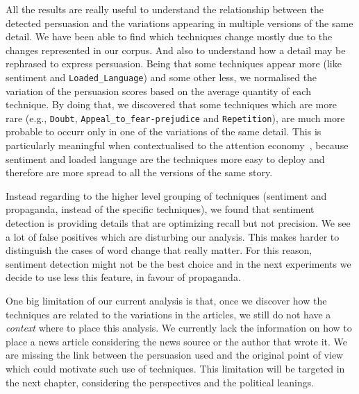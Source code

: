 All the results are really useful to understand the relationship between the detected persuasion and the variations appearing in multiple versions of the same detail.
We have been able to find which techniques change mostly due to the changes represented in our corpus. And also to understand how a detail may be rephrased to express persuasion.
Being that some techniques appear more (like 
 sentiment and \texttt{Loaded\_Language}) and some other less, we normalised the variation of the persuasion scores based on the average quantity of each technique.
 By doing that, we discovered that some techniques which are more rare (e.g., \texttt{Doubt}, \texttt{Appeal\_to\_fear-prejudice} and \texttt{Repetition}), are much more probable to occurr only in one of the variations of the same detail.
This is particularly meaningful when contextualised to the attention economy~\citep{davenport2001attention}, because sentiment and loaded language are the techniques more easy to deploy and therefore are more spread to all the versions of the same story.

Instead regarding to the higher level grouping of techniques (sentiment and propaganda, instead of the specific techniques), we found that sentiment detection is providing details that are optimizing recall but not precision. We see a lot of false positives which are disturbing our analysis. This makes harder to distinguish the cases of word change that really matter. For this reason, sentiment detection might not be the best choice and in the next experiments we decide to use less this feature, in favour of propaganda.


One big limitation of our current analysis is that, once we discover how the techniques are related to the variations in the articles, we still do not have a \emph{context} where to place this analysis. We currently lack the information on how to place a news article considering the news source or the author that wrote it. We are missing the link between the persuasion used and the original point of view which could motivate such use of techniques.
This limitation will be targeted in the next chapter, considering the perspectives and the political leanings.




